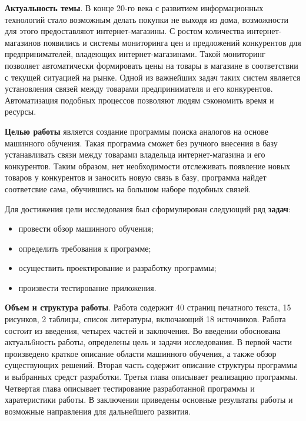 
\textbf{Актуальность темы}. В конце 20-го века с развитием информационных технологий стало возможным делать покупки не выходя из дома, возможности для этого предоставляют интернет-магазины. С ростом количества интернет-магазинов появились и системы мониторинга цен и предложений конкурентов для предпринимателей, владеющих интернет-магазинами. Такой мониторинг позволяет автоматически формировать
цены на товары в магазине в соответствии с текущей ситуацией на рынке. Одной из важнейших задач таких систем является установления связей между товарами предпринимателя и его конкурентов. Автоматизация подобных процессов позволяют людям сэкономить время и ресурсы. 

\textbf{Целью работы} является создание программы поиска аналогов на основе машинного обучения. Такая программа сможет без ручного внесения в базу устанавливать связи между товарами владельца интернет-магазина и его конкурентов. Таким образом, нет необходимости отслеживать появление новых товаров у конкурентов и заносить новую связь в базу, программа найдет соответсвие сама, обучившись на большом наборе подобных связей.

Для достижения цели исследования был сформулирован следующий ряд \textbf{задач}:

\begin{itemize}
  \item провести обзор машинного обучения;
  \item определить требования к программе;
  \item осуществить проектирование и разработку программы;
  \item произвести тестирование приложения.
\end{itemize}

\textbf{Объем и структура работы}. Работа содержит 40 страниц печатного текста, 15 рисунков, 2 таблицы, список литературы, включающий 18 источников. Работа состоит из введения, четырех частей и заключения. Во введении обоснована актуаль6ность работы, определены цель и задачи исследования. В первой части произведено краткое описание области машинного обучения, а также обзор существующих решений. Вторая часть содержит описание структуры программы и выбранных средст разработки. Третья глава описывает реализацию программы. Четвертая глава описывает тестирование разработанной программы и харатеристики работы. В заключении приведены основные результаты работы и возможные направления для дальнейшего развития.

\newpage
